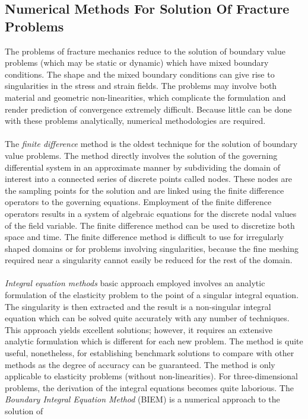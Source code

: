\documentclass[11pt]{article}
\begin{document}
\subsection{Numerical Methods For Solution Of Fracture Problems}
The problems of fracture mechanics reduce to the solution of boundary value problems (which may
be static or dynamic) which have mixed boundary conditions. The shape and the mixed boundary
conditions can give rise to singularities in the stress and strain fields. The problems may involve
both material and geometric non-linearities, which complicate the formulation and render
prediction of convergence extremely difficult. Because little can be done with these problems
analytically, numerical methodologies are required.
\\\\
The \textit{finite difference} method is the oldest technique for the solution of boundary value
problems. The method directly involves the solution of the
governing differential system in an approximate manner by subdividing the domain of interest into
a connected series of discrete points called nodes. These nodes are the sampling points for the
solution and are linked using the finite difference operators to the governing equations. Employment 
of the finite difference operators results in a system of algebraic equations for the discrete
nodal values of the field variable. The finite difference method can be used to discretize both space
and time. The finite difference method is difficult to use for irregularly shaped domains or for problems involving
singularities, because the fine meshing required near a singularity cannot easily be reduced for the
rest of the domain. 
\\\\
\textit{Integral equation methods} basic approach employed involves an analytic formulation
of the elasticity problem to the point of a singular integral equation. The singularity is then
extracted and the result is a non-singular integral equation which can be solved quite accurately
with any number of techniques. This approach yields excellent solutions; however, it requires an
extensive analytic formulation which is different for each new problem. The method is quite useful,
nonetheless, for establishing benchmark solutions to compare with other methods as the degree
of accuracy can be guaranteed. The method is only applicable to elasticity problems (without
non-linearities). For three-dimensional problems, the derivation of the integral equations becomes
quite laborious.
The \textit{Boundary Integral Equation  Method} (BIEM) is a numerical approach to the solution of
\end{document}
